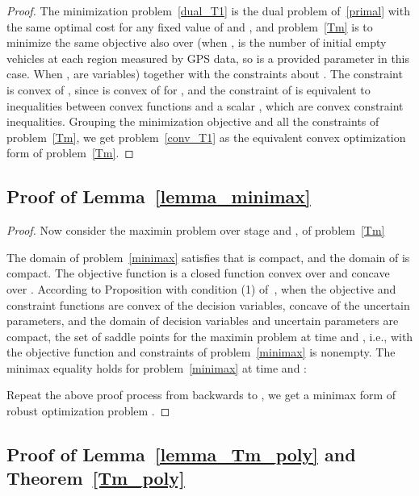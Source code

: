 \documentclass[10pt,twocolumn,twoside,english]{IEEEtran}
\begin{document}
\begin{proof}
The minimization problem~\eqref{dual_T1} is  the dual problem of~\eqref{primal} with the same optimal cost for any fixed value of  and , and problem~\eqref{Tm} is to minimize the same objective  also over  (when ,  is the number of initial empty vehicles at each region measured by GPS data, so  is a provided parameter in this case. When ,  are variables) together with the constraints about . The constraint  is convex of , since  is convex of  for , and the constraint of  is equivalent to  inequalities between convex functions and a scalar , which are convex constraint inequalities. Grouping the minimization objective and all the constraints of problem~\eqref{Tm}, we get problem~\eqref{conv_T1} as the equivalent convex optimization form of problem~\eqref{Tm}.
\end{proof}



\subsection{Proof of Lemma~\ref{lemma_minimax}}
\label{appendix_minimax}
\begin{proof}
Now consider the maximin problem over stage  and ,  of problem~\eqref{Tm}

The domain of problem~\eqref{minimax} satisfies that  is compact, and the domain of  is compact. The objective function is a closed function convex over  and concave over . According to Proposition  with condition (1) of~\cite{analysis_conv}, when the objective and constraint functions are convex of the decision variables, concave of the uncertain parameters, and the domain of decision variables and uncertain parameters are compact, the set of saddle points for the maximin problem at time  and , i.e.,  with the objective function and constraints of problem~\eqref{minimax} is nonempty. The minimax equality holds for problem~\eqref{minimax} at time  and : 
\\\centerline{}
Repeat the above proof process from  backwards to , we get a minimax form of robust optimization problem . \end{proof}



\subsection{Proof of Lemma~\ref{lemma_Tm_poly} and Theorem~\ref{Tm_poly}}
\label{appendix_poly}
\end{document}
